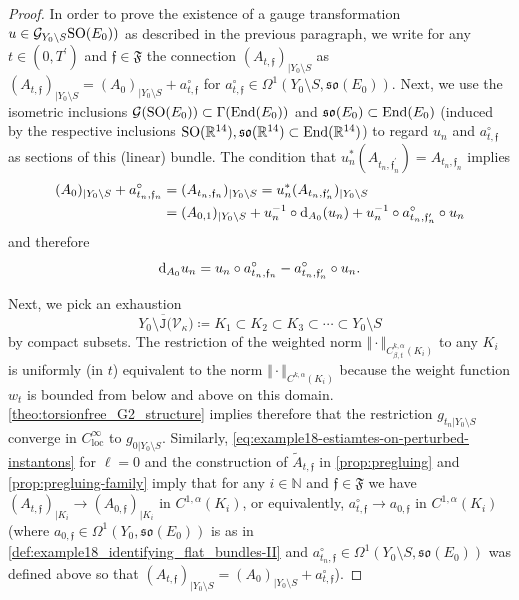 \documentclass[11pt,a4paper]{scrartcl}
\newcommand*\diff{\mathop{}\!\textup{d}}
\newcommand{\End}{\textup{End}}
\newcommand{\VertH}[2]{\Vert_{C^{{#1},\alpha}{#2}}}
\newcommand{\VertWHt}[3]{\Vert_{C^{{#1},\alpha}_{{#2},t}{#3}}}
\newcommand{\SO}{\textup{SO}}
\numberwithin{equation}{section}
\theoremstyle{plain}
\theoremstyle{definition}
\theoremstyle{remark}
\begin{document}
\begin{proof}
In order to prove the existence of a gauge transformation $u\in \mathcal{G}_{Y_0\setminus S}\SO(E_0))$ as described in the previous paragraph, we write for any $t\in(0,T^\prime)$ and $\mathfrak{f} \in \mathfrak{F}$ the connection $(A_{t,\mathfrak{f}})_{\vert Y_0 \setminus S}$ as $(A_{t,\mathfrak{f}})_{\vert Y_0 \setminus S} = (A_{0})_{\vert Y_0 \setminus S} + a_{t,\mathfrak{f}}^{\circ}$ for $a_{t,\mathfrak{f}}^\circ \in \Omega^1(Y_0\setminus S,\mathfrak{so}(E_0))$. Next, we use the isometric inclusions $\mathcal{G}(\SO(E_{0})) \subset \Gamma(\End(E_{0}))$ and $\mathfrak{so}(E_{0}) \subset \End(E_{0})$ (induced by the respective inclusions $\SO(\mathbb{R}^{14}),\mathfrak{so}(\mathbb{R}^{14})\subset \End(\mathbb{R}^{14})$) to regard $u_n$ and $a_{t,\mathfrak{f}}^\circ$ as sections of this (linear) bundle. The condition that $u_n^*(A_{t_n,\mathfrak{f}_n^\prime}) = A_{t_n,\mathfrak{f}_n}$ implies 
\begin{align*}
(A_{0})_{\vert Y_0 \setminus S} + a_{t_n,\mathfrak{f}_n}^\circ &= (A_{t_n,\mathfrak{f}_n})_{\vert Y_0 \setminus S} = u_n^*(A_{t_n,\mathfrak{f}_n^\prime})_{\vert Y_0 \setminus S} \\
&= (A_{0,1})_{\vert Y_0 \setminus S} + u_n^{-1} \circ \diff_{A_{0}}(u_n) + u_n^{-1} \circ a_{t_n,\mathfrak{f}_n^\prime}^\circ \circ u_n
\end{align*}
and therefore 
\begin{equation}\label{eq:example18-gauge_trafos-bootstrap}
\diff_{A_{0}} u_n = u_n \circ a_{t_n,\mathfrak{f}_n}^\circ - a_{t_n,\mathfrak{f}_n^\prime}^\circ \circ u_n.
\end{equation}

Next, we pick an exhaustion \[ \overline{Y_0\setminus \mathtt{J}(\mathcal{V}_\kappa}) \coloneqq K_1 \subset K_2 \subset K_3 \subset \cdots \subset Y_0 \setminus S \] by compact subsets. The restriction of the weighted norm $\Vert \cdot \VertWHt{k}{\beta}{(K_i)}$ to any $K_i$ is uniformly (in $t$) equivalent to the norm $\Vert \cdot \VertH{k}{(K_i)}$ because the weight function $w_t$ is bounded from below and above on this domain. \autoref{theo:torsionfree_G2_structure} implies therefore that the restriction $g_{t_n \vert Y_0\setminus S}$ converge in $C^\infty_{\text{loc}}$ to $g_{0 \vert Y_0 \setminus S}$. Similarly, \eqref{eq:example18-estiamtes-on-perturbed-instantons} for $\ell=0$ and the construction of $\tilde{A}_{t,\mathfrak{f}}$ in \autoref{prop:pregluing} and \autoref{prop:pregluing-family} imply that for any $i\in \mathbb{N}$ and $\mathfrak{f} \in \mathfrak{F}$ we have $(A_{t,\mathfrak{f}})_{\vert K_i} \to (A_{0,\mathfrak{f}})_{\vert K_i}$ in $C^{1,\alpha}(K_i)$, or equivalently, $a_{t,\mathfrak{f}}^\circ \to a_{0,\mathfrak{f}}$ in $C^{1,\alpha}(K_i)$ (where $a_{0,\mathfrak{f}} \in \Omega^1(Y_0,\mathfrak{so}(E_0))$ is as in \autoref{def:example18_identifying_flat_bundles-II} and $a_{t_n,\mathfrak{f}}^\circ\in \Omega^1(Y_0\setminus S,\mathfrak{so}(E_0))$ was defined above so that $(A_{t,\mathfrak{f}})_{\vert Y_0 \setminus S} = (A_{0})_{\vert Y_0 \setminus S} + a_{t,\mathfrak{f}}^\circ$).


\end{proof}
\end{document}
